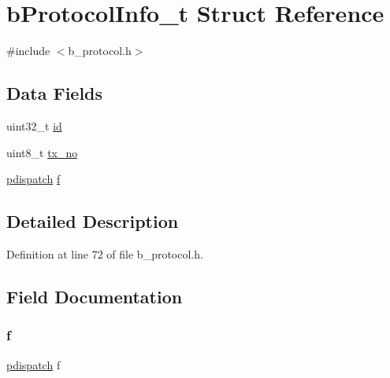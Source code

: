 \hypertarget{structb_protocol_info__t}{}\section{b\+Protocol\+Info\+\_\+t Struct Reference}
\label{structb_protocol_info__t}


{\ttfamily \#include $<$b\+\_\+protocol.\+h$>$}

\subsection*{Data Fields}
\begin{DoxyCompactItemize}
\item 
uint32\+\_\+t \mbox{\hyperlink{structb_protocol_info__t_abaabdc509cdaba7df9f56c6c76f3ae19}{id}}
\item 
uint8\+\_\+t \mbox{\hyperlink{structb_protocol_info__t_a65a520465829a72b4b90e063340fccbb}{tx\+\_\+no}}
\item 
\mbox{\hyperlink{group___p_r_o_t_o_c_o_l___exported___types_definitions_ga385520b45d23dc3a4dde23de92b85c75}{pdispatch}} \mbox{\hyperlink{structb_protocol_info__t_a2cd7dc696687cda89345c716c8004772}{f}}
\end{DoxyCompactItemize}


\subsection{Detailed Description}


Definition at line 72 of file b\+\_\+protocol.\+h.



\subsection{Field Documentation}
\mbox{\label{structb_protocol_info__t_a2cd7dc696687cda89345c716c8004772}} 
\subsubsection{\texorpdfstring{f}{f}}
{\footnotesize\ttfamily \mbox{\hyperlink{group___p_r_o_t_o_c_o_l___exported___types_definitions_ga385520b45d23dc3a4dde23de92b85c75}{pdispatch}} f}




